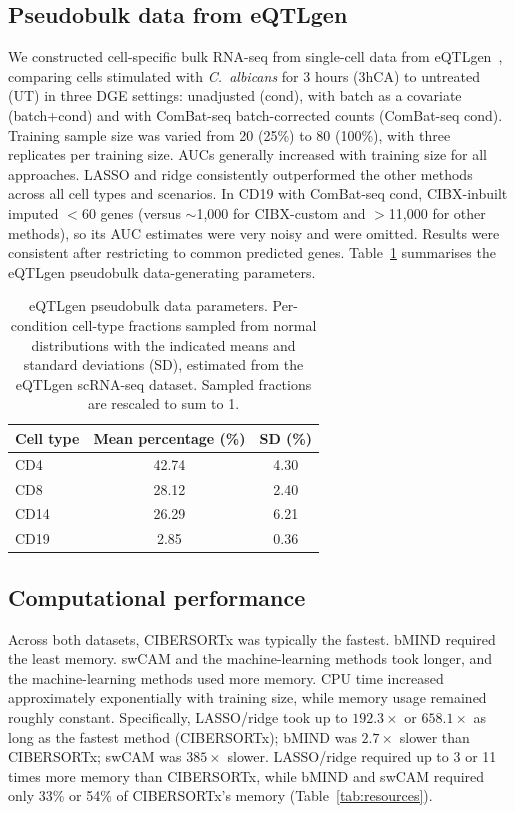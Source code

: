 \documentclass[11pt]{article}
\begin{document}
\subsection{Pseudobulk data from eQTLgen}
We constructed cell-specific bulk RNA-seq from single-cell data from eQTLgen~\citep{oosterhoff2023eqtlgen}, comparing cells stimulated with \emph{C.\ albicans} for 3 hours (3hCA) to untreated (UT) in three DGE settings: unadjusted (cond), with batch as a covariate (batch+cond) and with ComBat-seq batch-corrected counts (ComBat-seq cond). Training sample size was varied from 20 (25\%) to 80 (100\%), with three replicates per training size. AUCs generally increased with training size for all approaches. LASSO and ridge consistently outperformed the other methods across all cell types and scenarios. In CD19 with ComBat-seq cond, CIBX-inbuilt imputed $<$60 genes (versus $\sim$1{,}000 for CIBX-custom and $>$11{,}000 for other methods), so its AUC estimates were very noisy and were omitted. Results were consistent after restricting to common predicted genes. Table~\ref{tab:eqtl} summarises the eQTLgen pseudobulk data-generating parameters.

\begin{table}[htbp]
\centering
\caption{eQTLgen pseudobulk data parameters. Per-condition cell-type fractions sampled from normal distributions with the indicated means and standard deviations (SD), estimated from the eQTLgen scRNA-seq dataset. Sampled fractions are rescaled to sum to 1.}
\label{tab:eqtl}
\begin{tabular}{lcc}
\toprule
Cell type & Mean percentage (\%) & SD (\%) \\
\midrule
CD4  & 42.74 & 4.30 \\
CD8  & 28.12 & 2.40 \\
CD14 & 26.29 & 6.21 \\
CD19 &  2.85 & 0.36 \\
\bottomrule
\end{tabular}
\end{table}

\subsection{Computational performance}
Across both datasets, CIBERSORTx was typically the fastest. bMIND required the least memory. swCAM and the machine-learning methods took longer, and the machine-learning methods used more memory. CPU time increased approximately exponentially with training size, while memory usage remained roughly constant. Specifically, LASSO/ridge took up to $192.3\times$ or $658.1\times$ as long as the fastest method (CIBERSORTx); bMIND was $2.7\times$ slower than CIBERSORTx; swCAM was $385\times$ slower. LASSO/ridge required up to 3 or 11 times more memory than CIBERSORTx, while bMIND and swCAM required only 33\% or 54\% of CIBERSORTx's memory (Table~\ref{tab:resources}).
\end{document}
